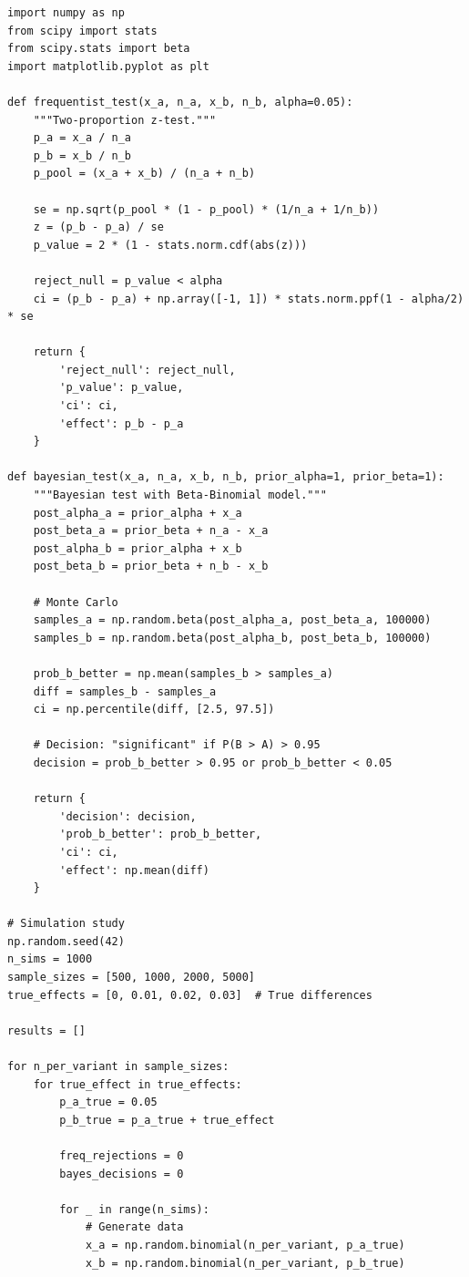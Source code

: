 \lstset{language=Python, caption=Simulation Study Comparing Frequentist and Bayesian Approaches}
\begin{lstlisting}
import numpy as np
from scipy import stats
from scipy.stats import beta
import matplotlib.pyplot as plt

def frequentist_test(x_a, n_a, x_b, n_b, alpha=0.05):
    """Two-proportion z-test."""
    p_a = x_a / n_a
    p_b = x_b / n_b
    p_pool = (x_a + x_b) / (n_a + n_b)

    se = np.sqrt(p_pool * (1 - p_pool) * (1/n_a + 1/n_b))
    z = (p_b - p_a) / se
    p_value = 2 * (1 - stats.norm.cdf(abs(z)))

    reject_null = p_value < alpha
    ci = (p_b - p_a) + np.array([-1, 1]) * stats.norm.ppf(1 - alpha/2) * se

    return {
        'reject_null': reject_null,
        'p_value': p_value,
        'ci': ci,
        'effect': p_b - p_a
    }

def bayesian_test(x_a, n_a, x_b, n_b, prior_alpha=1, prior_beta=1):
    """Bayesian test with Beta-Binomial model."""
    post_alpha_a = prior_alpha + x_a
    post_beta_a = prior_beta + n_a - x_a
    post_alpha_b = prior_alpha + x_b
    post_beta_b = prior_beta + n_b - x_b

    # Monte Carlo
    samples_a = np.random.beta(post_alpha_a, post_beta_a, 100000)
    samples_b = np.random.beta(post_alpha_b, post_beta_b, 100000)

    prob_b_better = np.mean(samples_b > samples_a)
    diff = samples_b - samples_a
    ci = np.percentile(diff, [2.5, 97.5])

    # Decision: "significant" if P(B > A) > 0.95
    decision = prob_b_better > 0.95 or prob_b_better < 0.05

    return {
        'decision': decision,
        'prob_b_better': prob_b_better,
        'ci': ci,
        'effect': np.mean(diff)
    }

# Simulation study
np.random.seed(42)
n_sims = 1000
sample_sizes = [500, 1000, 2000, 5000]
true_effects = [0, 0.01, 0.02, 0.03]  # True differences

results = []

for n_per_variant in sample_sizes:
    for true_effect in true_effects:
        p_a_true = 0.05
        p_b_true = p_a_true + true_effect

        freq_rejections = 0
        bayes_decisions = 0

        for _ in range(n_sims):
            # Generate data
            x_a = np.random.binomial(n_per_variant, p_a_true)
            x_b = np.random.binomial(n_per_variant, p_b_true)


\end{lstlisting}
